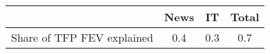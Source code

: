 \begin{small}
	\begin{tabular}{lccc}
	\hline
		& News & IT & Total \\
		\hline
		Share of TFP FEV explained & 0.4 & 0.3 & 0.7 \\
		\hline
	\end{tabular}
\end{small}
